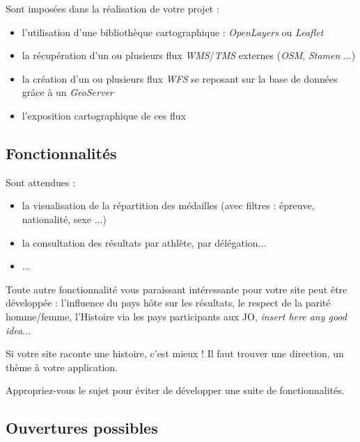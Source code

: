 \documentclass{article}
\begin{document}
Sont imposées dans la réalisation de votre projet :

\begin{itemize}

\item l'utilisation d'une bibliothèque cartographique : \textit{OpenLayers} ou \textit{Leaflet}

\item la récupération d'un ou plusieurs flux \textit{WMS}/\textit{TMS} externes (\textit{OSM}, \textit{Stamen} ...)

\item la création d'un ou plusieurs flux \textit{WFS} se reposant sur la base de données grâce à un \textit{GeoServer}

\item l'exposition cartographique de ces flux

\end{itemize}

\newpage

\subsection{Fonctionnalités}

Sont attendues :
\begin{itemize}

\item la visualisation de la répartition des médailles (avec filtres : épreuve, nationalité, sexe ...)

\item la consultation des résultats par athlète, par délégation...

\item ...

\end{itemize}

Toute autre fonctionnalité vous paraissant intéressante pour votre site peut être développée : l'influence du pays hôte sur les résultats, le respect de la parité homme/femme, l'Histoire via les pays participants aux JO, \textit{insert here any good idea}...

Si votre site raconte une histoire, c'est mieux ! Il faut trouver une direction, un thème à votre application.

Appropriez-vous le sujet pour éviter de développer une suite de fonctionnalités.

\subsection{Ouvertures possibles}
\end{document}
